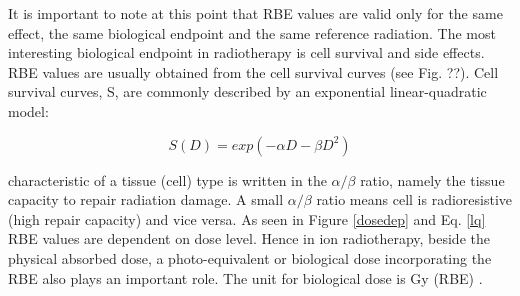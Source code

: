 \documentclass[type=dr, dr=rernat, accentcolor=tud7b,colorbacktitle, bigchapter, openright, twoside, 12pt ]{tudthesis}
\begin{document}
It is important to note at this point that RBE values are valid only for the same effect, the same biological endpoint and the same reference radiation. The most interesting biological endpoint in radiotherapy is cell survival and
side effects. RBE values are usually obtained from the cell survival curves (see Fig. ??). Cell survival curves, S, are commonly described by an exponential linear-quadratic model:

\begin{equation}
 S(D) = exp(-\alpha D - \beta D^2)
 \label{lq}
\end{equation}

characteristic of a tissue (cell) type is written in the $\alpha / \beta$ ratio, namely the tissue capacity to repair radiation damage. A small $\alpha / \beta$ ratio means cell is radioresistive (high repair capacity) and vice versa.
As seen in Figure \ref{dosedep} and Eq. \ref{lq} RBE values are dependent on dose level. Hence in ion radiotherapy, beside the physical absorbed dose, a photo-equivalent or biological dose incorporating the RBE also plays an important role. 
The unit for biological dose is Gy (RBE) \cite{ICRU2007}. 
\end{document}
